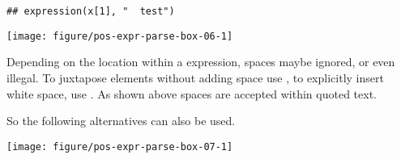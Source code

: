 \documentclass[krantz2]{krantz}\usepackage{knitr}%
\begin{document}
\begin{explainbox}
\begin{knitrout}\footnotesize
{}\color{fgcolor}\begin{kframe}
\begin{alltt}
\hlstd{(x[}\hlstd{],} \hlstd{)}
\end{alltt}
\begin{verbatim}
## expression(x[1], "  test")
\end{verbatim}
\end{kframe}
\end{knitrout}

\begin{knitrout}\footnotesize
{}\color{fgcolor}\begin{kframe}
\begin{alltt}
  \hlopt{+}
  \hlstd{()} \hlopt{+}
  \hlstd{(}\hlstd{(x[}\hlstd{],} \hlstd{))}
\end{alltt}
\end{kframe}

{\centering \texttt{[image: figure/pos-expr-parse-box-06-1]} 

}



\end{knitrout}

Depending on the location within a expression, spaces maybe ignored, or even illegal. To juxtapose elements without adding space use \code{*}, to explicitly insert white space, use \code{\textasciitilde}. As shown above spaces are accepted within quoted text.

So the following alternatives can also be used.

\begin{knitrout}\footnotesize
{}\color{fgcolor}\begin{kframe}
\begin{alltt}
  \hlopt{+}
  \hlstd{()} \hlopt{+}
  \hlstd{(}\hlstd{(} \hlstd{=} \hlstd{))}
\end{alltt}
\end{kframe}

{\centering \texttt{[image: figure/pos-expr-parse-box-07-1]} 

}
\end{knitrout}
\end{explainbox}
\end{document}
